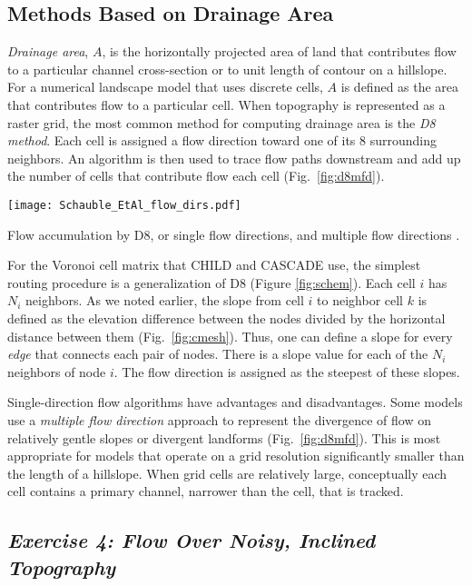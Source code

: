 \documentclass[12pt,reqno]{amsart}
\begin{document}
\subsection{Methods Based on Drainage Area}

{\em Drainage area}, $A$, is the horizontally projected area of land that contributes flow to a particular channel cross-section or to unit length of contour on a hillslope. For a numerical landscape model that uses discrete cells, $A$ is defined as the area that contributes flow to a particular cell. When topography is represented as a raster grid, the most common method for computing drainage area is the {\em D8 method}. Each cell is assigned a flow direction toward one of its 8 surrounding neighbors. An algorithm is then used to trace flow paths downstream and add up the number of cells that contribute flow each cell (Fig.\ \ref{fig:d8mfd}).

\begin{floatingfigure}{4.1in}
\centering
\texttt{[image: Schauble\_EtAl\_flow\_dirs.pdf]}
\captionsetup{width=3.7in}
\caption{Flow accumulation by D8, or single flow directions, and multiple flow directions \citep{schauble2008gis}.}
\label{fig:d8mfd}
\end{floatingfigure}

For the Voronoi cell matrix that CHILD and CASCADE use, the simplest routing procedure is a generalization of D8 (Figure \ref{fig:schem}). Each cell $i$ has $N_i$ neighbors. As we noted earlier, the slope from cell $i$ to neighbor cell $k$ is defined as the elevation difference between the nodes divided by the horizontal distance between them (Fig.\ \ref{fig:cmesh}). Thus, one can define a slope for every {\em edge} that connects each pair of nodes. There is a slope value for each of the $N_i$ neighbors of node $i$. The flow direction is assigned as the steepest of these slopes.

Single-direction flow algorithms have advantages and disadvantages. Some models use a {\em multiple flow direction} approach to represent the divergence of flow on relatively gentle slopes or divergent landforms (Fig.\ \ref{fig:d8mfd}). This is most appropriate for models that operate on a grid resolution significantly smaller than the length of a hillslope. When grid cells are relatively large, conceptually each cell contains a primary channel, narrower than the cell, that is tracked.

\subsection*{\em Exercise 4: Flow Over Noisy, Inclined Topography}
\end{document}
